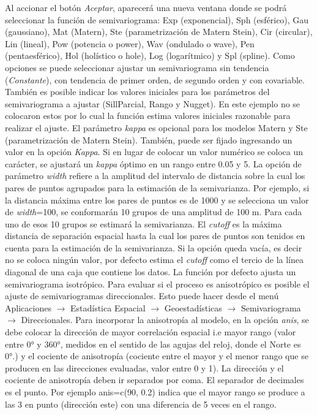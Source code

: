 \documentclass[11pt,b5paper,]{krantz}
\begin{document}
Al accionar el botón \emph{Aceptar}, aparecerá una nueva ventana donde
se podrá seleccionar la función de semivariograma: Exp (exponencial),
Sph (esférico), Gau (gaussiano), Mat (Matern), Ste (parametrización de
Matern Stein), Cir (circular), Lin (lineal), Pow (potencia o power), Wav
(ondulado o wave), Pen (pentaesférico), Hol (holístico o hole), Log
(logarítmico) y Spl (spline). Como opciones se puede seleccionar ajustar
un semivariograma sin tendencia (\emph{Constante}), con tendencia de
primer orden, de segundo orden y con covariable. También es posible
indicar los valores iniciales para los parámetros del semivariograma a
ajustar (SillParcial, Rango y Nugget). En este ejemplo no se colocaron
estos por lo cual la función estima valores iniciales razonable para
realizar el ajuste. El parámetro \emph{kappa} es opcional para los
modelos Matern y Ste (parametrización de Matern Stein). También, puede
ser fijado ingresando un valor en la opción \emph{Kappa}. Si en lugar de
colocar un valor numérico se coloca un carácter, se ajustará un
\emph{kappa} óptimo en un rango entre 0.05 y 5. La opción de parámetro
\emph{width} refiere a la amplitud del intervalo de distancia sobre la
cual los pares de puntos agrupados para la estimación de la
semivarianza. Por ejemplo, si la distancia máxima entre los pares de
puntos es de 1000 y se selecciona un valor de \emph{width}=100, se
conformarán 10 grupos de una amplitud de 100 m. Para cada uno de esos 10
grupos se estimará la semivarianza. El \emph{cutoff} es la máxima
distancia de separación espacial hasta la cual los pares de puntos son
tenidos en cuenta para la estimación de la semivarianza. Si la opción
queda vacía, es decir no se coloca ningún valor, por defecto estima el
\emph{cutoff} como el tercio de la línea diagonal de una caja que
contiene los datos. La función por defecto ajusta un semivariograma
isotrópico. Para evaluar si el proceso es anisotrópico es posible el
ajuste de semivariogramas direccionales. Esto puede hacer desde el menú
Aplicaciones \(\to\) Estadística Espacial \(\to\) Geoestadísticas
\(\to\) Semivariograma \(\to\) Direccionales. Para incorporar la
anisotropía al modelo, en la opción \emph{anis}, se debe colocar la
dirección de mayor correlación espacial i.e mayor rango (valor entre 0°
y 360°, medidos en el sentido de las agujas del reloj, donde el Norte es
0°.) y el cociente de anisotropía (cociente entre el mayor y el menor
rango que se producen en las direcciones evaluadas, valor entre 0 y 1).
La dirección y el cociente de anisotropía deben ir separados por coma.
El separador de decimales es el punto. Por ejemplo anis=c(90, 0.2)
indica que el mayor rango se produce a las 3 en punto (dirección este)
con una diferencia de 5 veces en el rango.
\end{document}
